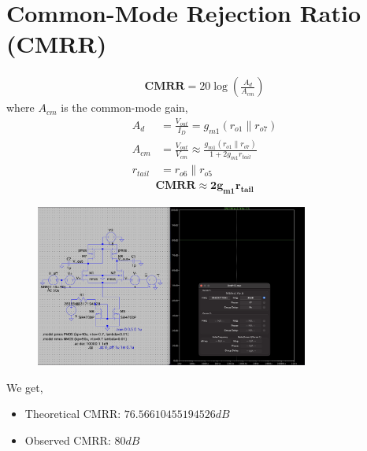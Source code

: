 \documentclass[12pt,a4paper]{article}
\newcommand{\brak}[1]{\ensuremath{\left(#1\right)}}
\providecommand{\brak}[1]{\ensuremath{\left(#1\right)}}
\begin{document}
\section{Common-Mode Rejection Ratio (CMRR)}
\begin{align*}
\textbf{CMRR} = 20 \log{\brak{\frac{A_{d}}{A_{cm}}} }
\end{align*}
where $A_{cm}$ is the common-mode gain,
\begin{align*}
    A_d &= \frac{V_{out}}{I_D} = g_{m1}(r_{o1}\parallel r_{o7}) \\
    A_{cm} &= \frac{V_{out}}{V_{cm}} \approx \frac{g_{m1}(r_{o1}\parallel r_{o7})}{1+2g_{m1}r_{tail}} \\
    r_{tail} &= r_{o6}\parallel r_{o5}
\end{align*}
\begin{align*}
    \mathbf{CMRR \approx 2g_{m1}r_{tail}}
\end{align*}
\vspace{6pt}
\begin{figure}[H]
    \centering
    \includegraphics[width=0.8\textwidth]{figs/CMRR.png}
\end{figure}
We get,
\begin{itemize}
    \item Theoretical CMRR: $76.56610455194526 dB$
    \item Observed CMRR: $80 dB$
\end{itemize}

\vspace{10pt}
\end{document}
